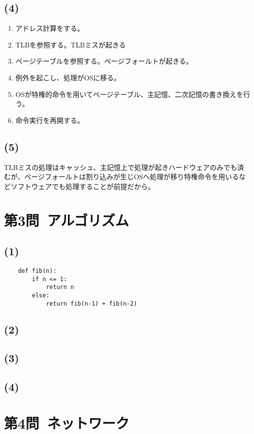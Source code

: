 \documentclass[a4paper,12pt,xelatex,ja=standard]{bxjsarticle}
\begin{document}
  \subsection*{(4)}
  \begin{enumerate}
    \item アドレス計算をする。
    \item TLBを参照する。TLBミスが起きる
    \item ページテーブルを参照する。ページフォールトが起きる。
    \item 例外を起こし、処理がOSに移る。
    \item OSが特権的命令を用いてページテーブル、主記憶、二次記憶の書き換えを行う。
    \item 命令実行を再開する。
  \end{enumerate}
  \subsection*{(5)}
  TLBミスの処理はキャッシュ、主記憶上で処理が起きハードウェアのみでも済むが、ページフォールトは割り込みが生じOSへ処理が移り特権命令を用いるなどソフトウェアでも処理することが前提だから。

\newpage
\section*{第3問\ アルゴリズム}
  \subsection*{(1)}
  \begin{lstlisting}
    def fib(n):
        if n <= 1:
            return n
        else:
            return fib(n-1) + fib(n-2)
  \end{lstlisting}
  \subsection*{(2)}
  \subsection*{(3)}
  \subsection*{(4)}

\section*{第4問\ ネットワーク}
\end{document}
